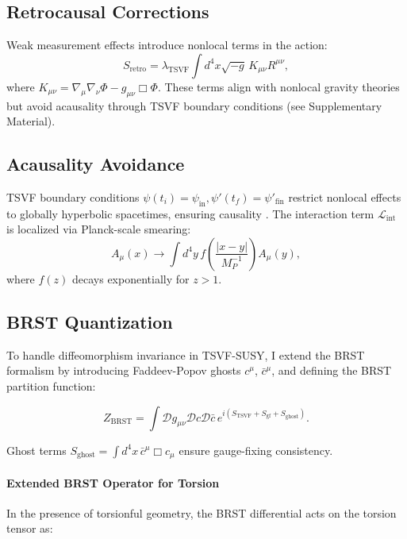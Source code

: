 \documentclass[twocolumn,superscriptaddress,floatfix]{revtex4-2}
\begin{document}
\subsection{Retrocausal Corrections}  
\label{subsec:retrocausal}  

Weak measurement effects \cite{Aharonov2008} introduce nonlocal terms in the action:  
\begin{equation}  
S_{\text{retro}} = \lambda_{\text{TSVF}} \int d^4x\sqrt{-g} \, K_{\mu\nu}R^{\mu\nu},  
\label{eq:retro_action}  
\end{equation}  
where \( K_{\mu\nu} = \nabla_\mu\nabla_\nu\Phi - g_{\mu\nu}\Box\Phi \). These terms align with nonlocal gravity theories \cite{Barvinsky2009} but avoid acausality through TSVF boundary conditions (see Supplementary Material).  

\subsection{Acausality Avoidance}  
\label{subsec:acausality}  
TSVF boundary conditions $\psi(t_i) = \psi_{\text{in}}, \psi'(t_f) = \psi'_{\text{fin}}$ restrict nonlocal effects to globally hyperbolic spacetimes, ensuring causality \cite{Wharton2016}. The interaction term $\mathcal{L}_{\text{int}}$ is localized via Planck-scale smearing:  
\begin{equation}  
A_\mu(x) \to \int d^4y \, f\left(\frac{|x-y|}{M_P^{-1}}\right) A_\mu(y),  
\end{equation}  
where $f(z)$ decays exponentially for $z > 1$.  

\subsection{BRST Quantization}  
\label{subsec:brst}  

To handle diffeomorphism invariance in TSVF-SUSY, I extend the BRST formalism by introducing Faddeev-Popov ghosts \( c^\mu \), \( \bar{c}^\mu \), and defining the BRST partition function:

\begin{equation}
Z_{\text{BRST}} = \int \mathcal{D}g_{\mu\nu} \mathcal{D}c \mathcal{D}\bar{c} \, e^{i\left(S_{\text{TSVF}} + S_{\text{gf}} + S_{\text{ghost}}\right)}.
\label{eq:brst}
\end{equation}

Ghost terms \( S_{\text{ghost}} = \int d^4x \, \bar{c}^\mu \Box c_\mu \) ensure gauge-fixing consistency.

\paragraph{Extended BRST Operator for Torsion}
In the presence of torsionful geometry, the BRST differential acts on the torsion tensor as:
\end{document}
